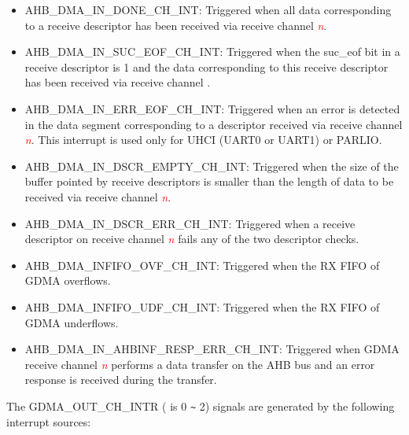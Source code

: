 \documentclass[main\_\_EN.tex]{subfiles}
\begin{document}
\begin{itemize}
    \item \label{int:GDMAINDONEINT}AHB\_DMA\_IN\_DONE\_CH\_INT: Triggered when all data corresponding to a receive descriptor has been received via receive channel \textcolor{red}{\it{n}}.
    \item \label{int:GDMAINSUCEOFINT}AHB\_DMA\_IN\_SUC\_EOF\_CH\_INT: Triggered when the suc\_eof bit in a receive descriptor is 1 and the data corresponding to this receive descriptor has been received via receive channel .
    \item \label{int:GDMAINERREOFINT}AHB\_DMA\_IN\_ERR\_EOF\_CH\_INT: Triggered when an error is detected in the data segment corresponding to a descriptor received via receive channel \textcolor{red}{\it{n}}. This interrupt is used only for UHCI (UART0 or UART1) or PARLIO.
    \item \label{int:GDMAINDSCREMPTYINT}AHB\_DMA\_IN\_DSCR\_EMPTY\_CH\_INT: Triggered when the size of the buffer pointed by receive descriptors is smaller than the length of data to be received via receive channel \textcolor{red}{\it{n}}.
    \item \label{int:GDMAINDSCRERRINT}AHB\_DMA\_IN\_DSCR\_ERR\_CH\_INT: Triggered when a receive descriptor on receive channel \textcolor{red}{\it{n}} fails any of the two descriptor checks.
    \item \label{int:GDMAINFIFOOVFINT}AHB\_DMA\_INFIFO\_OVF\_CH\_INT: Triggered when the RX FIFO of GDMA overflows.
    \item \label{int:GDMAINFIFOUDFINT}AHB\_DMA\_INFIFO\_UDF\_CH\_INT: Triggered when the  RX FIFO of GDMA underflows.
    \item \label{int:GDMAINAHBINFRESPERRINT}AHB\_DMA\_IN\_AHBINF\_RESP\_ERR\_CH\_INT: Triggered when GDMA receive channel \textcolor{red}{\it{n}} performs a data transfer on the AHB bus and an error response is received during the transfer.
\end{itemize}

The GDMA\_OUT\_CH\_INTR ( is 0 \verb+~+ 2) signals are generated by the following interrupt sources:
\end{document}
